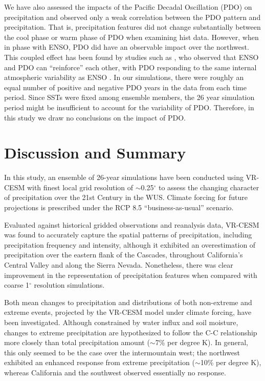 \documentclass{ametsoc}
\begin{document}
We have also assessed the impacts of the Pacific Decadal Oscillation (PDO) on precipitation and observed only a weak correlation between the PDO pattern and precipitation. That is, precipitation features did not change substantially between the cool phase or warm phase of PDO when examining \textsf{hist} data. However, when in phase with ENSO, PDO did have an observable impact over the northwest. This coupled effect has been found by studies such as \cite{gershunov1998interdecadal}, who observed that ENSO and PDO can ``reinforce'' each other, with PDO responding to the same internal atmospheric variability as ENSO \citep{pierce2002role}. In our simulations, there were roughly an equal number of positive and negative PDO years in the data from each time period. Since SSTs were fixed among ensemble members, the 26 year simulation period might be insufficient to account for the variability of PDO. Therefore, in this study we draw no conclusions on the impact of PDO.


\section{Discussion and Summary} \label{sec:Summary}

In this study, an ensemble of 26-year simulations have been conducted using VR-CESM with finest local grid resolution of $\sim$0.25$^\circ$ to assess the changing character of precipitation over the 21st Century in the WUS. Climate forcing for future projections is prescribed under the RCP 8.5 ``business-as-usual'' scenario. 

Evaluated against historical gridded observations and reanalysis data, VR-CESM was found to accurately capture the spatial patterns of precipitation, including precipitation frequency and intensity, although it exhibited an overestimation of precipitation over the eastern flank of the Cascades, throughout California's Central Valley and along the Sierra Nevada.  Nonetheless, there was clear improvement in the representation of precipitation features when compared with coarse 1$^\circ$ resolution simulations.

Both mean changes to precipitation and distributions of both non-extreme and extreme events, projected by the VR-CESM model under climate forcing, have been investigated.  Although constrained by water influx and soil moisture, changes to extreme precipitation are hypothesized to follow the C-C relationship more closely than total precipitation amount ($\sim$7\% per degree K).  In general, this only seemed to be the case over the intermountain west; the northwest exhibited an enhanced response from extreme precipitation ($\sim$10\% per degree K), whereas California and the southwest observed essentially no response.
\end{document}
